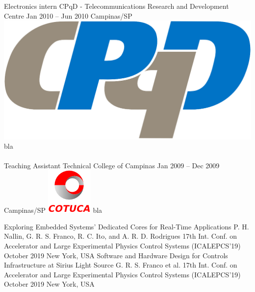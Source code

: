 \documentclass[
	a4paper,
]{fortysecondscv}
\newcommand{\profiledivider}{\textcolor{body!30}{\hdashrule{\linewidth}{0.6pt}{0.5ex}}\\}
\begin{document}
    \cvevent
        {Electronics intern}
        {CPqD - Telecommunications Research and Development Centre}
        {Jan 2010 -- Jun 2010}
        {Campinas/SP}
        {\hspace{2mm}\includegraphics[height=0.07\textwidth]{CPqD}}
        {bla}
    \\\profiledivider
    \cvevent
        {Teaching Assistant}
        {Technical College of Campinas}
        {Jan 2009 -- Dec 2009}
        {Campinas/SP}
        {\hspace{2mm}\includegraphics[height=0.07\textwidth]{Cotuca}}
        {bla}

\begin{cvtable}
	\cvpubitem
        {Exploring Embedded Systems' Dedicated Cores for Real-Time Applications}
        {P. H. Nallin, G. R. S. Franco, R. C. Ito, and A. R. D. Rodrigues}
		{17th Int. Conf. on Accelerator and Large Experimental Physics Control Systems (ICALEPCS'19)}
        {October 2019}
        {New York, USA}
	\cvpubitem
        {Software and Hardware Design for Controls Infrastructure at Sirius Light Source}
        {G. R. S. Franco et al.}
        {17th Int. Conf. on Accelerator and Large Experimental Physics Control Systems (ICALEPCS'19)}
        {October 2019}
        {New York, USA}
\end{cvtable}
\end{document}
